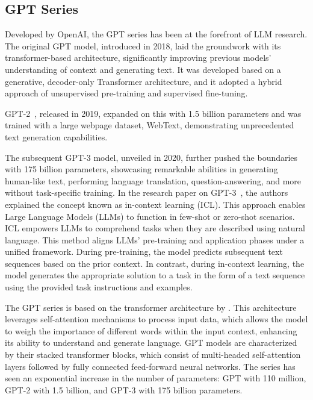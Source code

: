 \subsection{GPT Series}
\label{subsec:gpt-series}

Developed by OpenAI, the GPT series has been at the forefront of LLM research.
The original GPT model, introduced in 2018, laid the groundwork with its transformer-based architecture, significantly improving previous models' understanding of context and generating text.
It was developed based on a generative, decoder-only Transformer architecture, and it adopted a hybrid approach of unsupervised pre-training and supervised fine-tuning.

GPT-2~\cite{radford2019language}, released in 2019, expanded on this with 1.5 billion parameters and was trained with a large webpage dataset, WebText, demonstrating unprecedented text generation capabilities.

The subsequent GPT-3 model, unveiled in 2020, further pushed the boundaries with 175 billion parameters, showcasing remarkable abilities in generating human-like text, performing language translation, question-answering, and more without task-specific training.
In the research paper on GPT-3~\cite{brown2020language}, the authors explained the concept known as in-context learning (ICL). This approach enables Large Language Models (LLMs) to function in few-shot or zero-shot scenarios.
ICL empowers LLMs to comprehend tasks when they are described using natural language.
This method aligns LLMs' pre-training and application phases under a unified framework. During pre-training, the model predicts subsequent text sequences based on the prior context.
In contrast, during in-context learning, the model generates the appropriate solution to a task in the form of a text sequence using the provided task instructions and examples.

The GPT series is based on the transformer architecture by \textcite{vaswani2023attention}.
This architecture leverages self-attention mechanisms to process input data, which allows the model to weigh the importance of different words within the input context, enhancing its ability to understand and generate language.
GPT models are characterized by their stacked transformer blocks, which consist of multi-headed self-attention layers followed by fully connected feed-forward neural networks.
The series has seen an exponential increase in the number of parameters: GPT with 110 million, GPT-2 with 1.5 billion, and GPT-3 with 175 billion parameters.

